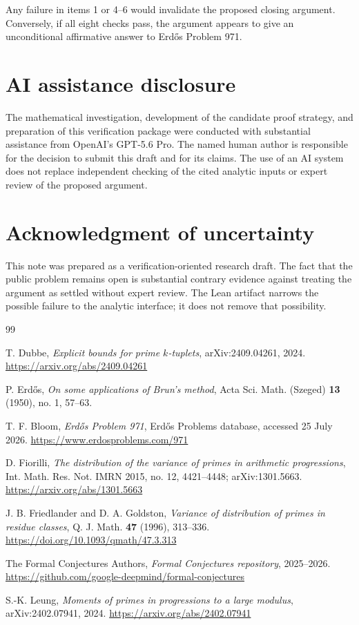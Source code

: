\documentclass[11pt]{article}
\theoremstyle{definition}
\theoremstyle{remark}
\begin{document}
Any failure in items 1 or 4--6 would invalidate the proposed closing argument. Conversely, if all eight checks pass, the argument appears to give an unconditional affirmative answer to Erd\H{o}s Problem 971.

\section*{AI assistance disclosure}

The mathematical investigation, development of the candidate proof strategy,
and preparation of this verification package were conducted with substantial
assistance from OpenAI's GPT-5.6 Pro. The named human author is responsible for
the decision to submit this draft and for its claims. The use of an AI system
does not replace independent checking of the cited analytic inputs or expert
review of the proposed argument.

\section*{Acknowledgment of uncertainty}

This note was prepared as a verification-oriented research draft.
The fact that the public problem remains open is substantial contrary evidence against treating the argument as settled without expert review.
The Lean artifact narrows the possible failure to the analytic interface; it does not remove that possibility.

\begin{thebibliography}{99}

T. Dubbe,
\emph{Explicit bounds for prime $k$-tuplets},
arXiv:2409.04261, 2024.
\url{https://arxiv.org/abs/2409.04261}

P. Erd\H{o}s,
\emph{On some applications of Brun's method},
Acta Sci. Math. (Szeged) \textbf{13} (1950), no. 1, 57--63.

T. F. Bloom,
\emph{Erd\H{o}s Problem 971},
Erd\H{o}s Problems database, accessed 25 July 2026.
\url{https://www.erdosproblems.com/971}

D. Fiorilli,
\emph{The distribution of the variance of primes in arithmetic progressions},
Int. Math. Res. Not. IMRN 2015, no. 12, 4421--4448;
arXiv:1301.5663.
\url{https://arxiv.org/abs/1301.5663}

J. B. Friedlander and D. A. Goldston,
\emph{Variance of distribution of primes in residue classes},
Q. J. Math. \textbf{47} (1996), 313--336.
\url{https://doi.org/10.1093/qmath/47.3.313}

The Formal Conjectures Authors,
\emph{Formal Conjectures repository}, 2025--2026.
\url{https://github.com/google-deepmind/formal-conjectures}

S.-K. Leung,
\emph{Moments of primes in progressions to a large modulus},
arXiv:2402.07941, 2024.
\url{https://arxiv.org/abs/2402.07941}

\end{thebibliography}
\end{document}
